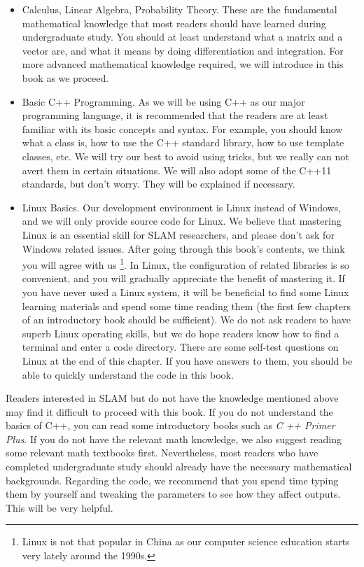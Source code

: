 \begin{itemize}
	\item Calculus, Linear Algebra, Probability Theory. These are the fundamental mathematical knowledge that most readers should have learned during undergraduate study. You should at least understand what a matrix and a vector are, and what it means by doing differentiation and integration. For more advanced mathematical knowledge required, we will introduce in this book as we proceed.
	\item Basic C++ Programming. As we will be using C++ as our major programming language, it is recommended that the readers are at least familiar with its basic concepts and syntax. For example, you should know what a class is, how to use the C++ standard library, how to use template classes, etc. We will try our best to avoid using tricks, but we really can not avert them in certain situations. We will also adopt some of the C++11 standards, but don't worry. They will be explained if necessary.

	\item Linux Basics. Our development environment is Linux instead of Windows, and we will only provide source code for Linux. We believe that mastering Linux is an essential skill for SLAM researchers, and please  don't ask for Windows related issues. After going through this book's contents, we think you will agree with us \footnote{Linux is not that popular in China as our computer science education starts very lately around the 1990s.}. In Linux, the configuration of related libraries is so convenient, and you will gradually appreciate the benefit of mastering it. If you have never used a Linux system, it will be beneficial to find some Linux learning materials and spend some time reading them (the first few chapters of an introductory book should be sufficient). We do not ask readers to have superb Linux operating skills, but we do hope readers know how to find a terminal and enter a code directory. There are some self-test questions on Linux at the end of this chapter. If you have answers to them, you should be able to quickly understand the code in this book.
\end{itemize}

Readers interested in SLAM but do not have the knowledge mentioned above may find it difficult to proceed with this book. If you do not understand the basics of C++, you can read some introductory books such as \textit{C ++ Primer Plus}. If you do not have the relevant math knowledge, we also suggest reading some relevant math textbooks first. Nevertheless, most readers who have completed undergraduate study should already have the necessary mathematical backgrounds. Regarding the code, we recommend that you spend time typing them by yourself and tweaking the parameters to see how they affect outputs. This will be very helpful.

